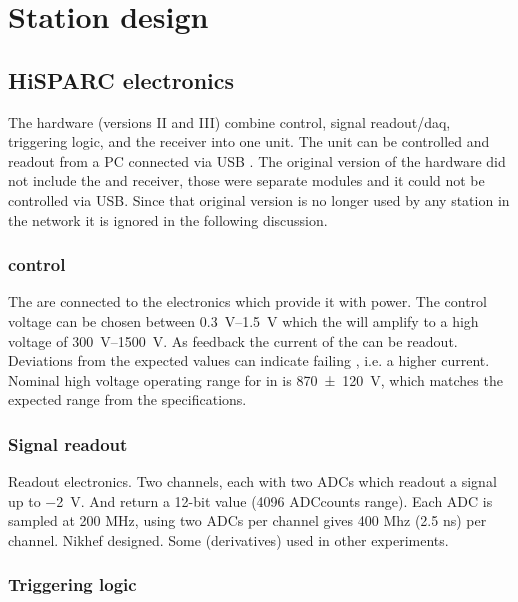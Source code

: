 

\section{Station design}
\label{sec:station-design}

\subsection{HiSPARC electronics}

The \hisparc hardware (versions II and III) combine \pmt control, signal readout/daq, triggering logic, and the \gps receiver into one unit. The unit can be controlled and readout from a PC connected via USB \cite{messages}. The original version of the \hisparc hardware did not include the \daq and \gps receiver, those were separate modules and it could not be controlled via USB. Since that original version is no longer used by any station in the network it is ignored in the following discussion.


\subsubsection{\pmt control}

The \pmts are connected to the \hisparc electronics which provide it with power. The control voltage can be chosen between \SIrange{.3}{1.5}{\volt} which the \pmt will amplify to a high voltage of \SIrange{300}{1500}{\volt}. As feedback the current of the \pmt can be readout. Deviations from the expected values can indicate failing \pmts, i.e. a higher current. Nominal high voltage operating range for \pmts in \hisparc is \SI{870\pm120}{\volt}, which matches the expected range from the \pmt specifications.


\subsubsection{Signal readout}

Readout electronics. Two channels, each with two ADCs which readout a signal up to \SI{-2}{\volt}. And return a 12-bit value (4096 ADCcounts range). Each ADC is sampled at 200 MHz, using two ADCs per channel gives 400 Mhz (2.5 ns) per channel. Nikhef designed. Some (derivatives) used in other experiments.


\subsubsection{Triggering logic}



